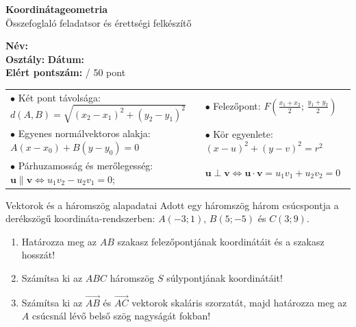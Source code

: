 \documentclass[11pt,a4paper]{article}
\begin{document}
\begin{tcolorbox}[colback=accentbg, colframe=primary, arc=3mm, boxrule=1.2pt]
  \begin{minipage}{0.58\textwidth}
    {\LARGE\bfseries\color{primary} Koordinátageometria}\\[1mm]
    {\large Összefoglaló feladatsor és érettségi felkészítő}
  \end{minipage}
  \hfill
  \begin{minipage}{0.38\textwidth}
    \small
    \textbf{Név:} \hrulefill \\[2.5mm]
    \textbf{Osztály:} \hrulefill \quad \textbf{Dátum:} \hrulefill \\[2.5mm]
    \textbf{Elért pontszám:} \dotfill / 50 pont
  \end{minipage}
\end{tcolorbox}

\vspace{2mm}

\begin{tcolorbox}[colback=white, colframe=secondary, title=\textbf{Fontosabb összefüggések emlékeztetőül}, fonttitle=\sffamily\small, arc=1.5mm, boxrule=0.8pt]
\small
\begin{tabular}{ll}
  $\bullet$ Két pont távolsága: $d(A, B) = \sqrt{(x_2-x_1)^2 + (y_2-y_1)^2}$ 
  & $\bullet$ Felezőpont: $F\left(\frac{x_1+x_2}{2};\, \frac{y_1+y_2}{2}\right)$ \\
  $\bullet$ Egyenes normálvektoros alakja: $A(x-x_0) + B(y-y_0) = 0$
  & $\bullet$ Kör egyenlete: $(x-u)^2 + (y-v)^2 = r^2$ \\
  $\bullet$ Párhuzamosság és merőlegesség: $\mathbf{u} \parallel \mathbf{v} \iff u_1 v_2 - u_2 v_1 = 0$; 
  & $\mathbf{u} \perp \mathbf{v} \iff \mathbf{u} \cdot \mathbf{v} = u_1 v_1 + u_2 v_2 = 0$
\end{tabular}
\end{tcolorbox}


\begin{feladatbox}[8 pont]{Vektorok és a háromszög alapadatai}
Adott egy háromszög három csúcspontja a derékszögű koordináta-rendszerben: $A(-3; 1)$, $B(5; -5)$ és $C(3; 9)$.
\begin{enumerate}
  \item Határozza meg az $AB$ szakasz felezőpontjának koordinátáit és a szakasz hosszát!
  \item Számítsa ki az $ABC$ háromszög $S$ súlypontjának koordinátáit!
  \item Számítsa ki az $\vec{AB}$ és $\vec{AC}$ vektorok skaláris szorzatát, majd határozza meg az $A$ csúcsnál lévő belső szög nagyságát fokban!
\end{enumerate}
\end{feladatbox}
\end{document}
